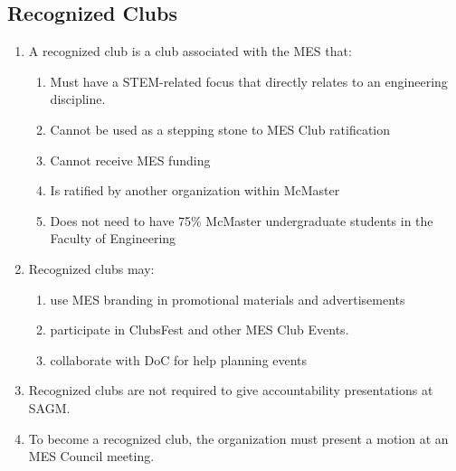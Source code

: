\subsection{Recognized Clubs}
\label{recognized-clubs}
\begin{enumerate}
 \item
  A recognized club is a club associated with the MES that:

  \begin{enumerate}
   \item
    Must have a STEM-related focus that directly relates to an engineering discipline.
   \item
    Cannot be used as a stepping stone to MES Club ratification
   \item
    Cannot receive MES funding
   \item
    Is ratified by another organization within McMaster
   \item
    Does not need to have 75\% McMaster undergraduate students in the Faculty of Engineering
  \end{enumerate}
 \item
  Recognized clubs may:

  \begin{enumerate}
   \item
    use MES branding in promotional materials and advertisements
   \item
    participate in ClubsFest and other MES Club Events.
   \item
    collaborate with DoC for help planning events
  \end{enumerate}
 \item
  Recognized clubs are not required to give accountability presentations at SAGM.
 \item
  To become a recognized club, the organization must present a motion at an MES Council meeting.
\end{enumerate}

